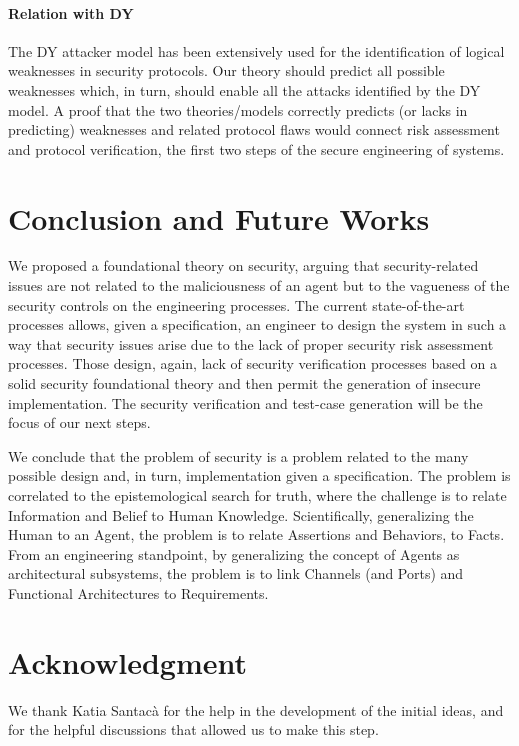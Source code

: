 \documentclass[conference]{IEEEtran}
\begin{document}
\paragraph{Relation with DY}
The DY attacker model has been extensively
used for the identification of logical weaknesses in security protocols.
Our theory should predict all possible weaknesses which, in turn,
should enable all the attacks identified by the DY model. 
A proof that the two theories/models correctly predicts
(or lacks in predicting) weaknesses and related protocol flaws would
connect risk assessment and protocol verification, the first
two steps of the secure engineering of systems.

\section{Conclusion and Future Works}
We proposed a foundational theory on security, arguing that
security-related issues are not related to the maliciousness of an agent but to
the vagueness of the security controls on the engineering processes.
The current state-of-the-art processes allows, given a specification,
an engineer to design the system in such a way that security issues arise due to the lack
of proper security risk assessment processes.
Those design, again, lack of security verification processes based on a solid 
security foundational theory and then permit the generation of insecure implementation.
The security verification and test-case generation will be the focus of our next steps.

We conclude that the problem of security is a problem related to the 
many possible design and, in turn, implementation given a specification.
The problem is correlated to the epistemological search for truth,
where the challenge is to relate Information and Belief to Human Knowledge.
Scientifically, generalizing the Human to an Agent, the problem is
to relate Assertions and Behaviors, to Facts. From an engineering standpoint,
by generalizing the concept of Agents as architectural subsystems, the
problem is to link Channels (and Ports) and Functional Architectures to 
Requirements.

\section*{Acknowledgment}
We thank Katia Santac\`a for the help in the development of the initial ideas, and for
the helpful discussions that allowed us to make this step.
\end{document}
